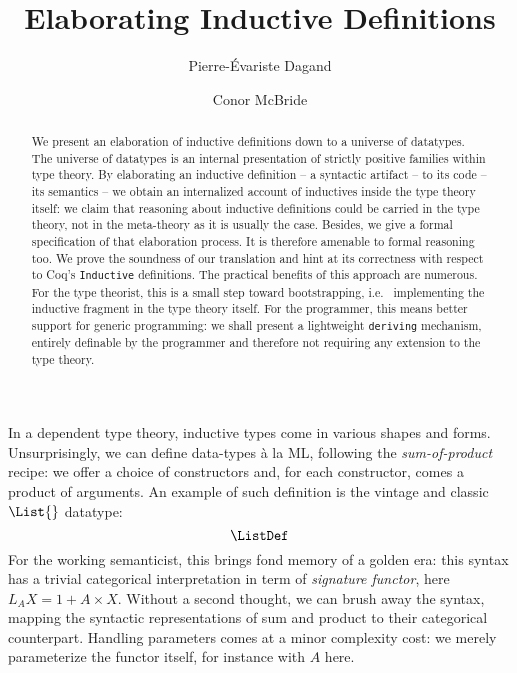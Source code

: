 \documentclass{scrartcl}
\title{Elaborating Inductive Definitions}
\author{Pierre-\'{E}variste Dagand \and Conor McBride}
\date{}
\theoremstyle{plain}
\theoremstyle{definition}
\newcommand{\ie}{i.e.\ }
\begin{document}
\maketitle



\begin{abstract}






We present an elaboration of inductive definitions down to a universe
of datatypes. The universe of datatypes is an internal presentation of
strictly positive families within type theory. By elaborating an
inductive definition -- a syntactic artifact -- to its code -- its
semantics -- we obtain an internalized account of inductives inside
the type theory itself: we claim that reasoning about inductive
definitions could be carried in the type theory, not in the
meta-theory as it is usually the case. Besides, we give a formal
specification of that elaboration process. It is therefore amenable to
formal reasoning too. We prove the soundness of our translation and
hint at its correctness with respect to Coq's \texttt{Inductive}
definitions. The practical benefits of this approach are numerous. For
the type theorist, this is a small step toward bootstrapping, \ie
implementing the inductive fragment in the type theory itself. For the
programmer, this means better support for generic programming: we
shall present a lightweight \texttt{deriving} mechanism, entirely
definable by the programmer and therefore not requiring any extension
to the type theory.

\end{abstract}



In a dependent type theory, inductive types come in various shapes and
forms. Unsurprisingly, we can define data-types \`{a} la ML,
following the \emph{sum-of-product} recipe: we offer a choice of
constructors and, for each constructor, comes a product of
arguments. An example of such definition is the vintage and classic
\(\List{}\) datatype:
\[
\ListDef
\]
For the working semanticist, this brings fond memory of a golden era:
this syntax has a trivial categorical interpretation in term of
\emph{signature functor}, here \(L_A X = 1 + A \times X\). Without a
second thought, we can brush away the syntax, mapping the syntactic
representations of sum and product to their categorical
counterpart. Handling parameters comes at a minor complexity cost: we
merely parameterize the functor itself, for instance with \(A\) here.
\end{document}

